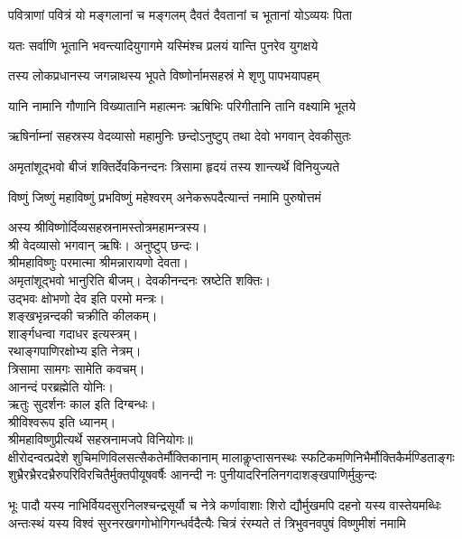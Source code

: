 \twolineshloka
{पवित्राणां पवित्रं यो मङ्गलानां च मङ्गलम्}
{दैवतं दैवतानां च भूतानां योऽव्ययः पिता}

\twolineshloka
{यतः सर्वाणि भूतानि भवन्त्यादियुगागमे}
{यस्मिंश्च प्रलयं यान्ति पुनरेव युगक्षये}

\twolineshloka
{तस्य लोकप्रधानस्य जगन्नाथस्य भूपते}
{विष्णोर्नामसहस्रं मे शृणु पापभयापहम्}

\twolineshloka
{यानि नामानि गौणानि विख्यातानि महात्मनः}
{ऋषिभिः परिगीतानि तानि वक्ष्यामि भूतये}

\twolineshloka
{ऋषिर्नाम्नां सहस्रस्य वेदव्यासो महामुनिः}
{छन्दोऽनुष्टुप् तथा देवो भगवान् देवकीसुतः}

\twolineshloka
{अमृतांशूद्भवो बीजं शक्तिर्देवकिनन्दनः}
{त्रिसामा हृदयं तस्य शान्त्यर्थे विनियुज्यते}

\twolineshloka
{विष्णुं जिष्णुं महाविष्णुं प्रभविष्णुं महेश्वरम्}
{अनेकरूपदैत्यान्तं नमामि पुरुषोत्तमं}

अस्य श्रीविष्णोर्दिव्यसहस्रनामस्तोत्रमहामन्त्रस्य।\\
श्री वेदव्यासो भगवान् ऋषिः। अनुष्टुप् छन्दः।\\
श्रीमहाविष्णुः परमात्मा श्रीमन्नारायणो देवता।\\
अमृतांशूद्भवो भानुरिति बीजम्। देवकीनन्दनः स्रष्टेति शक्तिः।\\
उद्भवः क्षोभणो देव इति परमो मन्त्रः।\\
शङ्खभृन्नन्दकी चक्रीति कीलकम्।\\
शार्ङ्गधन्वा गदाधर इत्यस्त्रम्। \\
रथाङ्गपाणिरक्षोभ्य इति नेत्रम्। \\
त्रिसामा सामगः सामेति कवचम्।\\
आनन्दं परब्रह्मेति योनिः।\\
ऋतुः सुदर्शनः काल इति दिग्बन्धः। \\
श्रीविश्वरूप इति ध्यानम्।\\
श्रीमहाविष्णुप्रीत्यर्थे सहस्रनामजपे विनियोगः॥\\

\resetShloka
\setlength{\shlokaspaceskip}{12pt}
\fourlineindentedshloka
{क्षीरोदन्वत्प्रदेशे शुचिमणिविलसत्सैकतेर्मौक्तिकानाम्}
{मालाकॢप्तासनस्थः स्फटिकमणिनिभैर्मौक्तिकैर्मण्डिताङ्गः}
{शुभ्रैरभ्रैरदभ्रैरुपरिविरचितैर्मुक्तपीयूषवर्षैः}
{आनन्दी नः पुनीयादरिनलिनगदाशङ्खपाणिर्मुकुन्दः}

\fourlineindentedshloka
{भूः पादौ यस्य नाभिर्वियदसुरनिलश्चन्द्रसूर्यौ च नेत्रे}
{कर्णावाशाः शिरो द्यौर्मुखमपि दहनो यस्य वास्तेयमब्धिः}
{अन्तःस्थं यस्य विश्वं सुरनरखगगोभोगिगन्धर्वदैत्यैः}
{चित्रं रंरम्यते तं त्रिभुवनवपुषं विष्णुमीशं नमामि}

